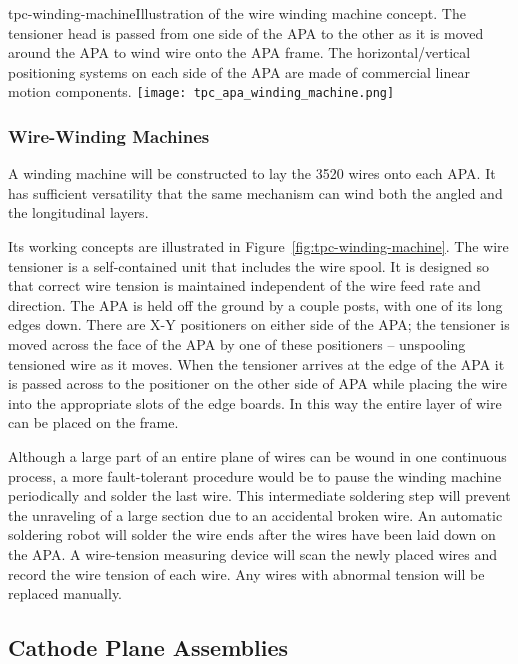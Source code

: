 \begin{cdrfigure}{tpc-winding-machine}{Illustration of the wire winding machine concept.  The tensioner head is passed from one side of the APA to the other as it is moved around the APA to wind wire onto the APA frame.  The horizontal/vertical positioning systems on each side of the APA are made of commercial linear motion components. }
\texttt{[image: tpc\_apa\_winding\_machine.png]}
\end{cdrfigure}


\subsubsection{Wire-Winding Machines}
\label{subsec:fd-ref-wirewinding}

A winding machine will be constructed to lay the 3520 wires onto each
APA. It has sufficient versatility that the same mechanism can wind
both the angled and the longitudinal layers.
 
Its working concepts are illustrated in
Figure~\ref{fig:tpc-winding-machine}.  The wire tensioner is a
self-contained unit that includes the wire spool.  It is designed so
that correct wire tension is maintained independent of the wire feed
rate and direction.  The APA is held off the ground by a couple posts,
with one of its long edges down.  There are X-Y positioners on either
side of the APA; the tensioner is moved across the face of the APA by
one of these positioners -- unspooling tensioned wire as it moves.
When the tensioner arrives at the edge of the APA it is passed across
to the positioner on the other side of APA while placing the wire into
the appropriate slots of the edge boards. In this way the entire layer
of wire can be placed on the frame.

Although a large part of an entire plane of wires can be wound in one
continuous process, a more fault-tolerant procedure would be to pause
the winding machine periodically and solder the last wire. This
intermediate soldering step will prevent the unraveling of a large
section due to an accidental broken wire.  An automatic soldering
robot will solder the wire ends after the wires have been laid down on
the APA. A wire-tension measuring device will scan the newly placed
wires and record the wire tension of each wire. Any wires with
abnormal tension will be replaced manually.



\subsection{Cathode Plane Assemblies}
\label{subsec:fd-ref-cpa}

